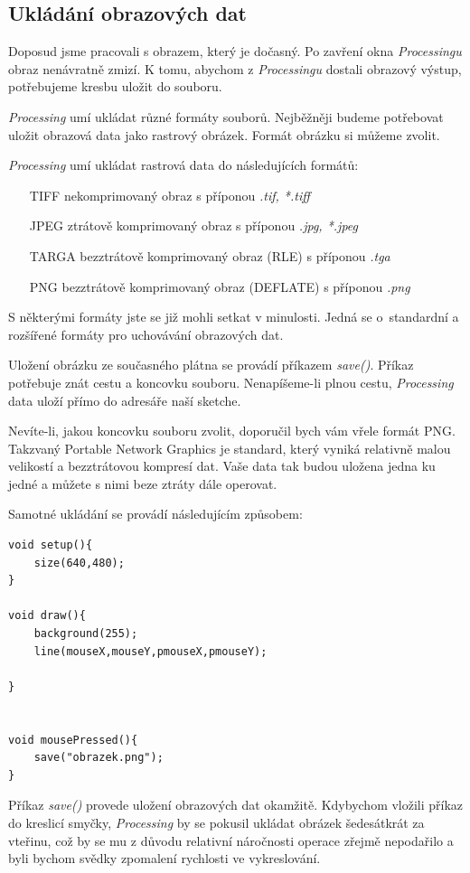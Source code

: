 \documentclass[10pt,twoside=true,open=right,cleardoublepage=empty,chapterprefix=true]{scrbook}
\newcommand{\pododdil}[1]{\subsection{#1}\index{#1}\label{#1}}
\newcommand{\vyraz}[1]{\textit{\gls{#1}}\index{#1}\label{#1}}
\newcommand{\lnb}{\linebreak}
\begin{document}
\pododdil{Ukládání obrazových dat}

Doposud jsme pracovali s obrazem, který je dočasný. Po zavření okna {\em Processingu} obraz nenávratně zmizí. K tomu, abychom z {\em Processingu} dostali obrazový výstup, potřebujeme kresbu uložit do souboru.

{\em Processing} umí ukládat různé formáty souborů. Nejběžněji budeme potřebovat uložit obrazová data jako rastrový obrázek. Formát obrázku si můžeme zvolit.

{\em Processing} umí ukládat rastrová data do následujících formátů:


\begin{itemize}
\item[TIFF]
nekomprimovaný obraz s příponou {\em *.tif, *.tiff}
\item[JPEG]
ztrátově komprimovaný obraz s příponou {\em *.jpg, *.jpeg}
\item[TARGA]
bezztrátově komprimovaný obraz (RLE) s příponou {\em *.tga}
\item[PNG]
bezztrátově komprimovaný obraz (DEFLATE) s příponou {\em *.png}

\end{itemize}

S některými formáty jste se již mohli setkat v minulosti. Jedná se \lnb o~standardní a rozšířené formáty pro uchovávání obrazových dat.

Uložení obrázku ze současného plátna se provádí příkazem \vyraz{save()}. Příkaz potřebuje znát cestu a koncovku souboru. Nenapíšeme-li plnou cestu, {\em Processing} data uloží přímo do adresáře naší sketche.

Nevíte-li, jakou koncovku souboru zvolit, doporučil bych vám vřele formát PNG. Takzvaný Portable Network Graphics je standard, který vyniká relativně malou velikostí a bezztrátovou kompresí dat. Vaše data tak budou uložena jedna ku jedné a můžete s nimi beze ztráty dále operovat. 

Samotné ukládání se provádí následujícím způsobem:

\begin{lstlisting} 
void setup(){
	size(640,480);
}

void draw(){
	background(255);
	line(mouseX,mouseY,pmouseX,pmouseY);

}


void mousePressed(){
	save("obrazek.png");
}

\end{lstlisting}


Příkaz \vyraz{save()} provede uložení obrazových dat okamžitě. Kdybychom vložili příkaz do kreslicí smyčky, {\em Processing} by se pokusil ukládat obrá\-zek šedesátkrát za vteřinu, což by se mu z důvodu relativní náročnosti operace zřejmě nepodařilo a byli bychom svědky zpomalení rychlosti ve vykreslování.
\end{document}
